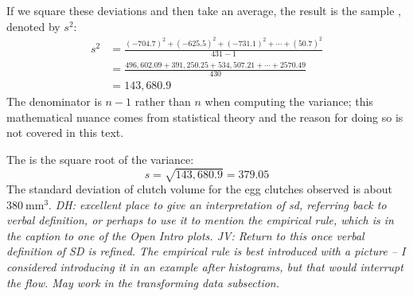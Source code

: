 \begin{doublespace}
If we square these deviations and then take an average, the result is the sample \label{varianceFirstDiscussed}, denoted by $s^2$:
\begin{align*}
s^2 &= \frac{(-704.7)^2 + (-625.5)^2 + (-731.1)^2 + \cdots + (50.7)^2}{431-1} \\
&= \frac{496,602.09 + 391,250.25 + 534,507.21 + \cdots + 2570.49}{430} \\
&= 143,680.9
\end{align*}
The denominator is $n-1$ rather than $n$ when computing the variance; this mathematical nuance comes from statistical theory and the reason for doing so is not covered in this text.

The  is the square root of the variance:
$$s=\sqrt{143,680.9} = 379.05$$
 The standard deviation of clutch volume for the egg clutches observed is about $380\ \textrm{mm}^{3}$.  \textit{DH: excellent place to give an interpretation of sd, referring back to verbal definition, or perhaps to use it to mention the empirical rule, which is in the caption to one of the Open Intro plots. JV: Return to this once verbal definition of SD is refined. The empirical rule is best introduced with a picture -- I considered introducing it in an example after histograms, but that would interrupt the flow. May work in the transforming data subsection.}

\end{doublespace}
